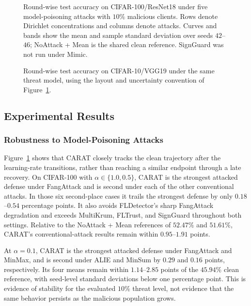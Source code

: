 \begin{figure}[!t]
  \centering
  \caption{Round-wise test accuracy on CIFAR-100/ResNet18 under five model-poisoning attacks with $10\%$ malicious clients. Rows denote Dirichlet concentrations and columns denote attacks. Curves and bands show the mean and sample standard deviation over seeds $42$--$46$; NoAttack + Mean is the shared clean reference. SignGuard was not run under Mimic.}
  \label{fig:table1-curves-cifar100}
\end{figure}

\begin{figure}[!t]
  \centering
  \caption{Round-wise test accuracy on CIFAR-10/VGG19 under the same threat model, using the layout and uncertainty convention of Figure~\ref{fig:table1-curves-cifar100}.}
  \label{fig:table1-curves-cifar10}
\end{figure}

\subsection{Experimental Results}

\subsubsection{Robustness to Model-Poisoning Attacks}
Figure~\ref{fig:table1-curves-cifar100} shows that CARAT closely tracks the clean trajectory after the learning-rate transitions, rather than reaching a similar endpoint through a late recovery. On CIFAR-100 with $\alpha\in\{1.0,0.5\}$, CARAT is the strongest attacked defense under FangAttack and is second under each of the other conventional attacks. In those six second-place cases it trails the strongest defense by only $0.18$--$0.54$ percentage points. It also avoids FLDetector's sharp FangAttack degradation and exceeds MultiKrum, FLTrust, and SignGuard throughout both settings. Relative to the NoAttack + Mean references of $52.47\%$ and $51.61\%$, CARAT's conventional-attack results remain within $0.95$--$1.91$ points.

At $\alpha=0.1$, CARAT is the strongest attacked defense under FangAttack and MinMax, and is second under ALIE and MinSum by $0.29$ and $0.16$ points, respectively. Its four means remain within $1.14$--$2.85$ points of the $45.94\%$ clean reference, with seed-level standard deviations below one percentage point. This is evidence of stability for the evaluated $10\%$ threat level, not evidence that the same behavior persists as the malicious population grows.


